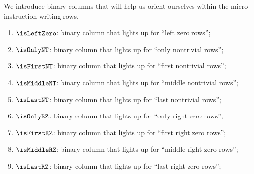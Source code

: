 We introduce binary columns that will help us orient ourselves within the micro-instruction-writing-rows.
\begin{enumerate}[resume]
	\item $\isLeftZero$:
		binary column that lights up for ``left zero rows''; 
	\item $\isOnlyNT$:
		binary column that lights up for ``only nontrivial rows''; 
	\item $\isFirstNT$:
		binary column that lights up for ``first nontrivial rows''; 
	\item $\isMiddleNT$:
		binary column that lights up for ``middle nontrivial rows''; 
	\item $\isLastNT$:
		binary column that lights up for ``last nontrivial rows''; 
	\item $\isOnlyRZ$:
		binary column that lights up for ``only right zero rows''; 
	\item $\isFirstRZ$:
		binary column that lights up for ``first right zero rows''; 
	\item $\isMiddleRZ$:
		binary column that lights up for ``middle right zero rows''; 
	\item $\isLastRZ$:
		binary column that lights up for ``last right zero rows''; 
\end{enumerate}
